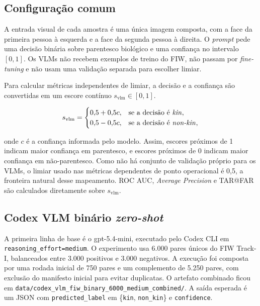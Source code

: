 \subsection{Configuração comum}

A entrada visual de cada amostra é uma única imagem composta, com a face da primeira pessoa à esquerda e a face da segunda pessoa à direita. O \textit{prompt} pede uma decisão binária sobre parentesco biológico e uma confiança no intervalo $[0,1]$. Os VLMs não recebem exemplos de treino do FIW, não passam por \textit{fine-tuning} e não usam uma validação separada para escolher limiar.

Para calcular métricas independentes de limiar, a decisão e a confiança são convertidas em um escore contínuo $s_{\text{vlm}} \in [0,1]$.

\begin{equation}
s_{\text{vlm}} =
\begin{cases}
0{,}5 + 0{,}5c, & \text{se a decisão é \textit{kin}},\\
0{,}5 - 0{,}5c, & \text{se a decisão é \textit{non-kin}},
\end{cases}
\label{eq:vlm_score}
\end{equation}

onde $c$ é a confiança informada pelo modelo. Assim, escores próximos de 1 indicam maior confiança em parentesco, e escores próximos de 0 indicam maior confiança em não-parentesco. Como não há conjunto de validação próprio para os VLMs, o limiar usado nas métricas dependentes de ponto operacional é 0,5, a fronteira natural desse mapeamento. ROC AUC, \textit{Average Precision} e TAR@FAR são calculados diretamente sobre $s_{\text{vlm}}$.

\subsection{Codex VLM binário \textit{zero-shot}}

A primeira linha de base é o gpt-5.4-mini, executado pelo Codex CLI em \texttt{reasoning\_effort=medium}. O experimento usa 6.000 pares únicos do FIW Track-I, balanceados entre 3.000 positivos e 3.000 negativos. A execução foi composta por uma rodada inicial de 750 pares e um complemento de 5.250 pares, com exclusão do manifesto inicial para evitar duplicatas. O artefato combinado ficou em \texttt{data/codex\_vlm\_fiw\_binary\_6000\_medium\_combined/}. A saída esperada é um JSON com \texttt{predicted\_label} em \{\texttt{kin}, \texttt{non\_kin}\} e \texttt{confidence}.

